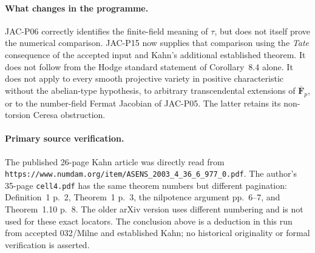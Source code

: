 \paragraph{What changes in the programme.}
JAC-P06 correctly identifies the finite-field meaning of $\tau$,
but does not itself prove the numerical comparison. JAC-P15 now
supplies that comparison using the \emph{Tate} consequence of the
accepted input and Kahn's additional established theorem. It
does not follow from the Hodge standard statement of Corollary~8.4
alone. It does not apply to every smooth projective variety in
positive characteristic without the abelian-type hypothesis, to
arbitrary transcendental extensions of $\overline{\mathbf F}_p$,
or to the number-field Fermat Jacobian of JAC-P05. The latter
retains its non-torsion Ceresa obstruction.

\paragraph{Primary source verification.}
The published 26-page Kahn article was directly read from
\texttt{https://www.numdam.org/item/ASENS\_2003\_4\_36\_6\_977\_0.pdf}.
The author's 35-page \texttt{cell4.pdf} has the same theorem numbers
but different pagination: Definition~1 p.~2, Theorem~1 p.~3,
the nilpotence argument pp.~6--7, and Theorem~1.10 p.~8.
The older arXiv version uses different numbering and is not used
for these exact locators. The conclusion above is a deduction
in this run from accepted 032/Milne and established Kahn; no
historical originality or formal verification is asserted.

